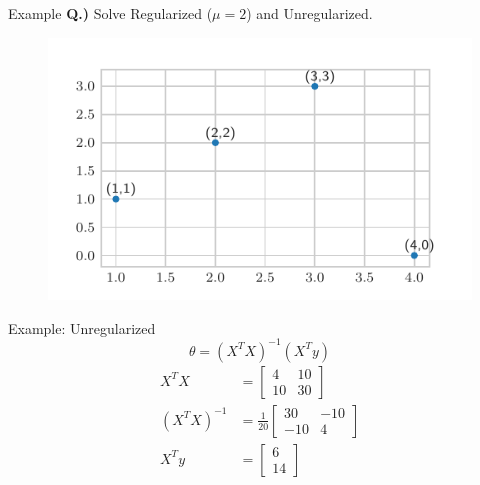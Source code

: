 \documentclass{beamer}
\begin{document}
\begin{frame}{Example}
\vspace{0.4cm}
\textbf{Q.)} Solve Regularized ($\mu = 2$) and Unregularized.
\vspace{-0.6cm}
\begin{figure}
\includegraphics[width=\linewidth]{ridge/temp.pdf}
\end{figure}
\end{frame}

\begin{frame}{Example: Unregularized}
\[
\theta = (X^{T}X)^{-1}(X^{T}y)
\]
\pause
\begin{align*}
X^{T}X &= \begin{bmatrix}
4 &10\\10&30
\end{bmatrix} \\
(X^{T}X)^{-1} &= \frac{1}{20} \begin{bmatrix}
30 & -10\\
-10& 4
\end{bmatrix}\\
X^{T}y &= \begin{bmatrix}
6\\
14
\end{bmatrix}
\end{align*}
\end{frame}
\end{document}
